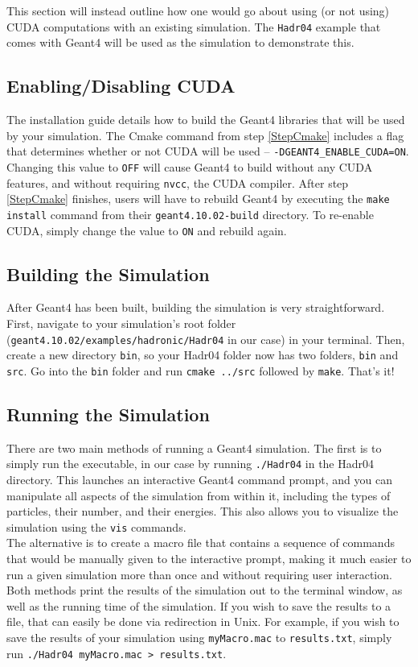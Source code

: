 \documentclass[12pt]{article}
\begin{document}
This section will instead outline how one would go about using (or not using) CUDA computations with an existing simulation. The \texttt{Hadr04} example that comes with Geant4 will be used as the simulation to demonstrate this.

\subsection{Enabling/Disabling CUDA} %
The installation guide details how to build the Geant4 libraries that will be used by your simulation. The Cmake command from step \ref{StepCmake} includes a flag that determines whether or not CUDA will be used -- \texttt{-DGEANT4\_ENABLE\_CUDA=ON}. Changing this value to \texttt{OFF} will cause Geant4 to build without any CUDA features, and without requiring \texttt{nvcc}, the CUDA compiler. After step \ref{StepCmake} finishes, users will have to rebuild Geant4 by executing the \texttt{make install} command from their \texttt{geant4.10.02-build} directory. To re-enable CUDA, simply change the value to \texttt{ON} and rebuild again.

\subsection{Building the Simulation}\label{SecSimulations} %
After Geant4 has been built, building the simulation is very straightforward. First, navigate to your simulation's root folder (\texttt{geant4.10.02/examples/hadronic/Hadr04} in our case) in your terminal. Then, create a new directory \texttt{bin}, so your Hadr04 folder now has two folders, \texttt{bin} and \texttt{src}. Go into the \texttt{bin} folder and run \texttt{cmake ../src} followed by \texttt{make}. That's it!

\subsection{Running the Simulation} %
There are two main methods of running a Geant4 simulation. The first is to simply run the executable, in our case by running \texttt{./Hadr04} in the Hadr04 directory. This launches an interactive Geant4 command prompt, and you can manipulate all aspects of the simulation from within it, including the types of particles, their number, and their energies. This also allows you to visualize the simulation using the \texttt{vis} commands.\\

The alternative is to create a macro file that contains a sequence of commands that would be manually given to the interactive prompt, making it much easier to run a given simulation more than once and without requiring user interaction. Both methods print the results of the simulation out to the terminal window, as well as the running time of the simulation. If you wish to save the results to a file, that can easily be done via redirection in Unix. For example, if you wish to save the results of your simulation using \texttt{myMacro.mac} to \texttt{results.txt}, simply run \texttt{./Hadr04 myMacro.mac > results.txt}.
\end{document}
